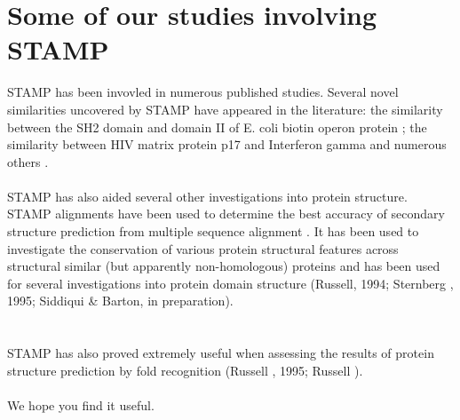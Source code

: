 \chapter{Some of our studies involving STAMP}

STAMP has been invovled in numerous published studies.  
Several novel similarities uncovered by STAMP have appeared 
in the literature: the similarity between the SH2 domain 
and domain II of E. coli biotin operon protein \cite{rb93b}; the 
similarity between HIV matrix protein p17 and Interferon 
gamma \cite{matthews94} and numerous others \cite{russell94,russell96,russell97a}.\\
\\
STAMP has also aided several other investigations 
into protein structure.  STAMP alignments have been used to 
determine the best accuracy of secondary structure prediction 
from multiple sequence alignment \cite{rb93c}. It has been used to 
investigate the conservation of various protein structural features 
across  structural similar (but apparently non-homologous) proteins 
\cite{rb94,russell97b} and has been used for several investigations into protein domain 
structure (Russell, 1994; Sternberg \ea, 1995; Siddiqui \& Barton, in preparation).\\
\nocite{russell94,sternberg95}\\
\\
STAMP has also proved extremely useful when assessing the results of
protein structure prediction by fold recognition (Russell \ea, 1995; Russell ).\\
\nocite{rcb95a,rcb96}
\\
We hope you find it useful.

\nocite{TitlesOn}




